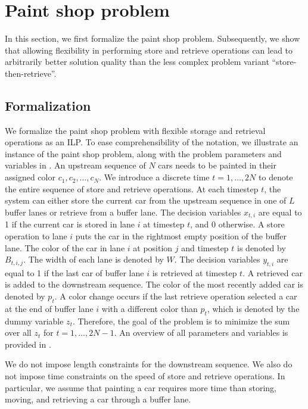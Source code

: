 \documentclass[11pt]{elsarticle}
\begin{document}
\section{Paint shop problem}
\label{section-PS-problem}

In this section, we first formalize the paint shop problem. Subsequently, we show that allowing flexibility in performing store and retrieve operations can lead to arbitrarily better solution quality than the less complex problem variant ``store-then-retrieve''.


\subsection{Formalization}

We formalize the paint shop problem with flexible storage and retrieval operations as an ILP. To ease comprehensibility of the notation, we illustrate an instance of the paint shop problem, along with the problem parameters and variables in . An upstream sequence of $N$ cars needs to be painted in their assigned color $c_1, c_2, \dots, c_N$. We introduce a discrete time $t=1,\dots,2N$ to denote the entire sequence of store and retrieve operations. At each timestep $t$, the system can either store the current car from the upstream sequence in one of $L$ buffer lanes or retrieve from a buffer lane. The decision variables $x_{t,i}$ are equal to 1 if the current car is stored in lane $i$ at timestep $t$, and 0 otherwise. A store operation to lane $i$ puts the car in the rightmost empty position of the buffer lane. The color of the car in lane $i$ at position $j$ and timestep $t$ is denoted by $B_{t,i,j}$. The width of each lane is denoted by $W$. The decision variables $y_{t,i}$ are equal to 1 if the last car of buffer lane $i$ is retrieved at timestep $t$. A retrieved car is added to the downstream sequence. The color of the most recently added car is denoted by $p_t$. A color change occurs if the last retrieve operation selected a car at the end of buffer lane $i$ with a different color than $p_t$, which is denoted by the dummy variable $z_t$. Therefore, the goal of the problem is to minimize the sum over all $z_t$ for $t=1,\dots,2N-1$. An overview of all parameters and variables is provided in .

We do not impose length constraints for the downstream sequence. We also do not impose time constraints on the speed of store and retrieve operations. In particular, we assume that painting a car requires more time than storing, moving, and retrieving a car through a buffer lane.
\end{document}
